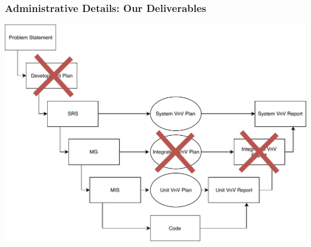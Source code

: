 \documentclass[t,12pt,numbers,fleqn]{beamer}
\begin{document}
\begin{frame}

\frametitle{Administrative Details: Our Deliverables}

\begin{center}
\includegraphics[scale=0.55]{../Figures/VModelOfProcessXOut.pdf}
\end{center}
\vspace{-1.0cm}

\end{frame}

\end{document}
